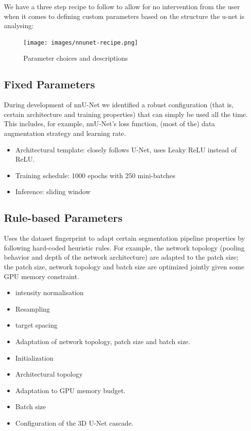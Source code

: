 \documentclass[11pt]{article}
\begin{document}
We have a three step recipe to follow to allow for no intervention from the user when it comes to defining custom parameters based on the structure the u-net is analysing:

\begin{figure}[H]
    \texttt{[image: images/nnunet-recipe.png]}
    \caption{Parameter choices and descriptions}
\end{figure}

\subsection{Fixed Parameters}

During development of nnU-Net we identified a robust configuration (that is, certain architecture and training properties) that can simply be used all the time. This includes, for example, nnU-Net's loss function, (most of the) data augmentation strategy and learning rate.

\begin{itemize}
    \item Architectural template: closely follows U-Net, uses Leaky ReLU instead of ReLU.
    \item Training schedule: 1000 epochs with 250 mini-batches
    \item Inference: sliding window
\end{itemize}

\subsection{Rule-based Parameters}

Uses the dataset fingerprint to adapt certain segmentation pipeline properties by following hard-coded heuristic rules. For example, the network topology (pooling behavior and depth of the network architecture) are adapted to the patch size; the patch size, network topology and batch size are optimized jointly given some GPU memory constraint.

\begin{itemize}
    \item intensity normalisation
    \item Resampling
    \item target spacing
    \item Adaptation of network topology, patch size and batch size.
    \item Initialization
    \item Architectural topology
    \item Adaptation to GPU memory budget.
    \item Batch size
    \item Configuration of the 3D U-Net cascade.
\end{itemize}
\end{document}

